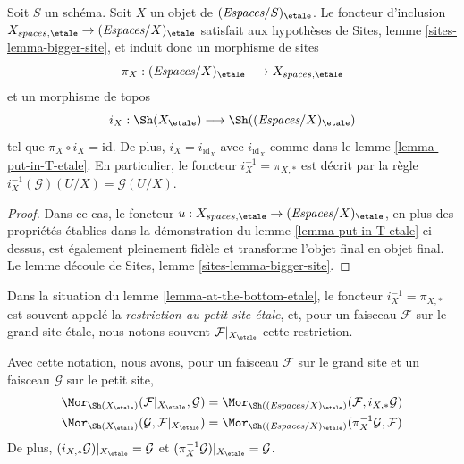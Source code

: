 \begin{lemma}
\label{lemma-at-the-bottom-etale}
Soit $S$ un schéma. Soit $X$ un objet de $(\textit{Espaces}/S)_\etale$.
Le foncteur d'inclusion $X_{spaces, \etale} \to (\textit{Espaces}/X)_\etale$
satisfait aux hypothèses de Sites, lemme \ref{sites-lemma-bigger-site},
et induit donc un morphisme de sites
$$
\pi_X :
(\textit{Espaces}/X)_\etale
\longrightarrow
X_{spaces, \etale}
$$
et un morphisme de topos
$$
i_X :
\Sh(X_\etale)
\longrightarrow
\Sh((\textit{Espaces}/X)_\etale)
$$
tel que $\pi_X \circ i_X = \text{id}$. De plus, $i_X = i_{\text{id}_X}$
avec $i_{\text{id}_X}$ comme dans le lemme \ref{lemma-put-in-T-etale}.
En particulier, le foncteur $i_X^{-1} = \pi_{X, *}$ est décrit par la règle
$i_X^{-1}(\mathcal{G})(U/X) = \mathcal{G}(U/X)$.
\end{lemma}

\begin{proof}
Dans ce cas, le foncteur
$u : X_{spaces, \etale} \to (\textit{Espaces}/X)_\etale$,
en plus des propriétés établies dans la démonstration du
lemme \ref{lemma-put-in-T-etale} ci-dessus, est également pleinement fidèle
et transforme l'objet final en objet final.
Le lemme découle de Sites, lemme \ref{sites-lemma-bigger-site}.
\end{proof}

\begin{definition}
\label{definition-restriction-small-etale}
Dans la situation du lemme \ref{lemma-at-the-bottom-etale},
le foncteur $i_X^{-1} = \pi_{X, *}$ est souvent
appelé la {\it restriction au petit site \'etale}, et, pour un faisceau
$\mathcal{F}$ sur le grand site \'etale, nous notons souvent
$\mathcal{F}|_{X_\etale}$ cette restriction.
\end{definition}

\noindent
Avec cette notation, nous avons, pour un faisceau $\mathcal{F}$ sur le
grand site et un faisceau $\mathcal{G}$ sur le petit site,
\begin{align*}
\Mor_{\Sh(X_\etale)}(
\mathcal{F}|_{X_\etale},
\mathcal{G})
& =
\Mor_{\Sh((\textit{Espaces}/X)_\etale)}(
\mathcal{F},
i_{X, *}\mathcal{G}) \\
\Mor_{\Sh(X_\etale)}(
\mathcal{G},
\mathcal{F}|_{X_\etale})
& =
\Mor_{\Sh((\textit{Espaces}/X)_\etale)}(
\pi_X^{-1}\mathcal{G},
\mathcal{F})
\end{align*}
De plus, $(i_{X, *}\mathcal{G})|_{X_\etale} = \mathcal{G}$
et $(\pi_X^{-1}\mathcal{G})|_{X_\etale} = \mathcal{G}$.

